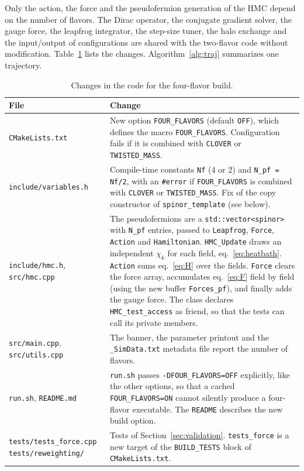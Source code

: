 \documentclass[11pt,a4paper]{article}
\newcommand{\code}[1]{\texttt{#1}}
\begin{document}
Only the action, the force and the pseudofermion generation of the HMC depend on the number of flavors. The
Dirac operator, the conjugate gradient solver, the gauge force, the leapfrog integrator, the step-size tuner,
the halo exchange and the input/output of configurations are shared with the two-flavor code without
modification. Table~\ref{tab:code} lists the changes. Algorithm~\ref{alg:traj} summarizes one trajectory.

\begin{table}[h]
\centering
\small
\begin{tabular}{p{}p{}}
\toprule
File & Change \\
\midrule
\code{CMakeLists.txt} &
New option \code{FOUR\_FLAVORS} (default \code{OFF}), which defines the macro \code{FOUR\_FLAVORS}. Configuration
fails if it is combined with \code{CLOVER} or \code{TWISTED\_MASS}. \\
\code{include/variables.h} &
Compile-time constants \code{Nf} (4 or 2) and \code{N\_pf = Nf/2}, with an \code{\#error} if \code{FOUR\_FLAVORS} is
combined with \code{CLOVER} or \code{TWISTED\_MASS}. Fix of the copy constructor of \code{spinor\_template} (see
below). \\
\code{include/hmc.h}, \code{src/hmc.cpp} &
The pseudofermions are a \code{std::vector<spinor>} with \code{N\_pf} entries, passed to \code{Leapfrog},
\code{Force}, \code{Action} and \code{Hamiltonian}. \code{HMC\_Update} draws an independent $\chi_k$ for each field,
eq.~\eqref{eq:heatbath}. \code{Action} sums eq.~\eqref{eq:H} over the fields. \code{Force} clears the force array,
accumulates eq.~\eqref{eq:F} field by field (using the new buffer \code{Forces\_pf}), and finally adds the gauge
force. The class declares \code{HMC\_test\_access} as friend, so that the tests can call its private members. \\
\code{src/main.cpp}, \code{src/utils.cpp} &
The banner, the parameter printout and the \code{\_SimData.txt} metadata file report the number of flavors. \\
\code{run.sh}, \code{README.md} &
\code{run.sh} passes \code{-DFOUR\_FLAVORS=OFF} explicitly, like the other options, so that a cached
\code{FOUR\_FLAVORS=ON} cannot silently produce a four-flavor executable. The \code{README} describes the new build
option. \\
\code{tests/tests\_force.cpp} \newline \code{tests/reweighting/} &
Tests of Section~\ref{sec:validation}. \code{tests\_force} is a new target of the \code{BUILD\_TESTS} block of
\code{CMakeLists.txt}. \\
\bottomrule
\end{tabular}
\caption{Changes in the code for the four-flavor build.}
\label{tab:code}
\end{table}
\end{document}
